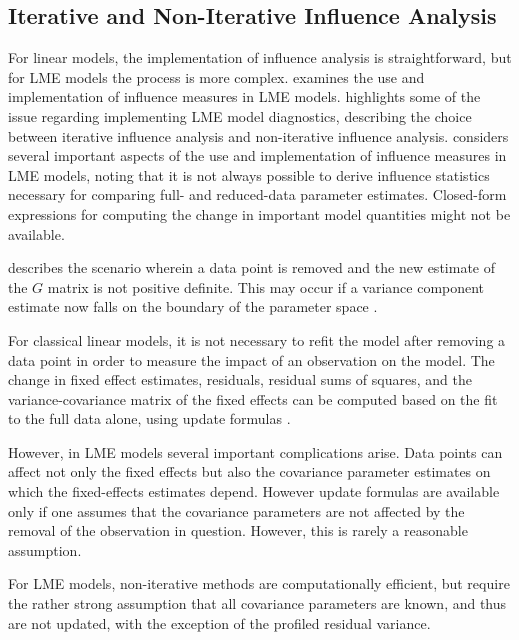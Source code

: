 \documentclass[12pt, a4paper]{report}
\theoremstyle{definition}
\theoremstyle{remark}
\begin{document}
\subsection{Iterative and Non-Iterative Influence Analysis}




For linear models, the implementation of influence analysis is straightforward, but for LME models the process is more complex. \citet{schabenberger} examines the use and implementation of
influence measures in LME models. \citet{schabenberger} highlights some of the issue regarding implementing LME model diagnostics, describing  the choice between  iterative influence analysis and  non-iterative influence analysis.
\citet{schabenberger} considers several important aspects of the use and implementation of influence measures in LME models, noting that it is not always possible to
derive influence statistics necessary for comparing full- and reduced-data parameter estimates. Closed-form expressions for computing the change in important model quantities might not be available.

\citet{schabenberger} describes the scenario wherein a data point is removed and the new estimate of the $G$ matrix is not positive definite. This may occur if a variance component
estimate now falls on the boundary of the parameter space \citep{schabenberger}. 

For classical linear models, it is not necessary to refit the model after removing a data point in order to measure the impact of an observation on the model. The change in fixed effect estimates, residuals, residual sums of squares, and the variance-covariance matrix of the fixed effects can be computed based on the fit to the full data alone, using update formulas \citep{sherman, hager1989}.


However, in LME models several important complications arise. Data points can affect not only the fixed effects but also the covariance parameter estimates on which the fixed-effects estimates depend. However update formulas are available only if one assumes that the covariance parameters are not affected by the removal of the observation in question. However, this is rarely a reasonable assumption.

For LME models, non-iterative methods are computationally efficient, but require the rather strong assumption that all covariance parameters are known, and thus are not updated, with the exception of the profiled residual variance.
\end{document}
